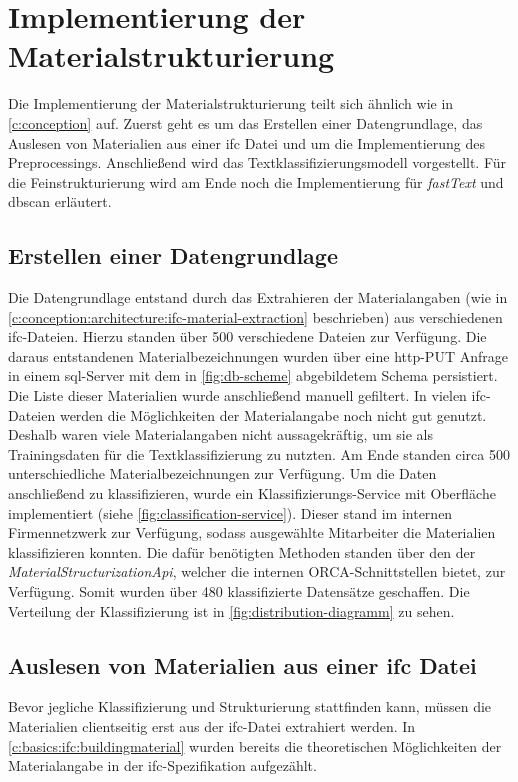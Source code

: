 \section{Implementierung der Materialstrukturierung}
\label{c:implementation:structuring}
Die Implementierung der Materialstrukturierung teilt sich ähnlich wie in \autoref{c:conception} auf. Zuerst geht es um das Erstellen einer Datengrundlage, das Auslesen von Materialien aus einer \ac{ifc} Datei und um die Implementierung des Preprocessings. Anschließend wird das Textklassifizierungsmodell vorgestellt. Für die Feinstrukturierung wird am Ende noch die Implementierung für \textit{fastText} und \ac{dbscan} erläutert.

\subsection{Erstellen einer Datengrundlage}
\label{c:implementation:data} 
Die Datengrundlage entstand durch das Extrahieren der Materialangaben (wie in \autoref{c:conception:architecture:ifc-material-extraction} beschrieben) aus verschiedenen \ac{ifc}-Dateien. Hierzu standen über 500 verschiedene Dateien zur Verfügung. Die daraus entstandenen Materialbezeichnungen wurden über eine \ac{http}-PUT Anfrage in einem \ac{sql}-Server mit dem in \autoref{fig:db-scheme} abgebildetem Schema persistiert. Die Liste dieser Materialien wurde anschließend manuell gefiltert. In vielen \ac{ifc}-Dateien werden die Möglichkeiten der Materialangabe noch nicht gut genutzt. Deshalb waren viele Materialangaben nicht aussagekräftig, um sie als Trainingsdaten für die Textklassifizierung zu nutzten. Am Ende standen circa 500 unterschiedliche Materialbezeichnungen zur Verfügung.
Um die Daten anschließend zu klassifizieren, wurde ein Klassifizierungs-Service mit Oberfläche implementiert (siehe  \autoref{fig:classification-service}). Dieser stand im internen Firmennetzwerk zur Verfügung, sodass ausgewählte Mitarbeiter die Materialien klassifizieren konnten. Die dafür benötigten Methoden standen über den  der \textit{MaterialStructurizationApi}, welcher die internen ORCA-Schnittstellen bietet, zur Verfügung. Somit wurden über 480 klassifizierte Datensätze geschaffen. Die Verteilung der Klassifizierung ist in \autoref{fig:distribution-diagramm} zu sehen.

\subsection{Auslesen von Materialien aus einer \ac{ifc} Datei}
\label{c:conception:architecture:ifc-material-extraction}
Bevor jegliche Klassifizierung und Strukturierung stattfinden kann, müssen die Materialien clientseitig erst aus der \ac{ifc}-Datei extrahiert werden. In \autoref{c:basics:ifc:buildingmaterial} wurden bereits die theoretischen Möglichkeiten der Materialangabe in der \ac{ifc}-Spezifikation aufgezählt.

